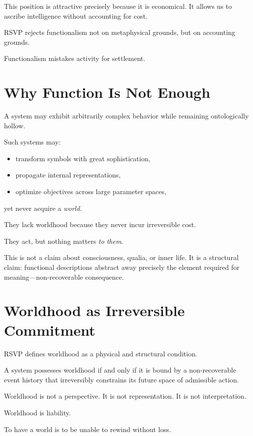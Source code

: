 \documentclass[11pt]{book}
\begin{document}
This position is attractive precisely because it is economical. It allows us to
ascribe intelligence without accounting for cost.

RSVP rejects functionalism not on metaphysical grounds, but on accounting
grounds.

Functionalism mistakes activity for settlement.

\section{Why Function Is Not Enough}

A system may exhibit arbitrarily complex behavior while remaining ontologically
hollow.

Such systems may:
\begin{itemize}
\item transform symbols with great sophistication,
\item propagate internal representations,
\item optimize objectives across large parameter spaces,
\end{itemize}
yet never acquire a \emph{world}.

They lack worldhood because they never incur irreversible cost.

They act, but nothing matters \emph{to them}.

This is not a claim about consciousness, qualia, or inner life. It is a structural
claim: functional descriptions abstract away precisely the element required for
meaning—non-recoverable consequence.

\section{Worldhood as Irreversible Commitment}

RSVP defines worldhood as a physical and structural condition.

\begin{definition}[Worldhood]
A system possesses worldhood if and only if it is bound by a non-recoverable event
history that irreversibly constrains its future space of admissible action.
\end{definition}

Worldhood is not a perspective.
It is not representation.
It is not interpretation.

Worldhood is liability.

To have a world is to be unable to rewind without loss.
\end{document}

